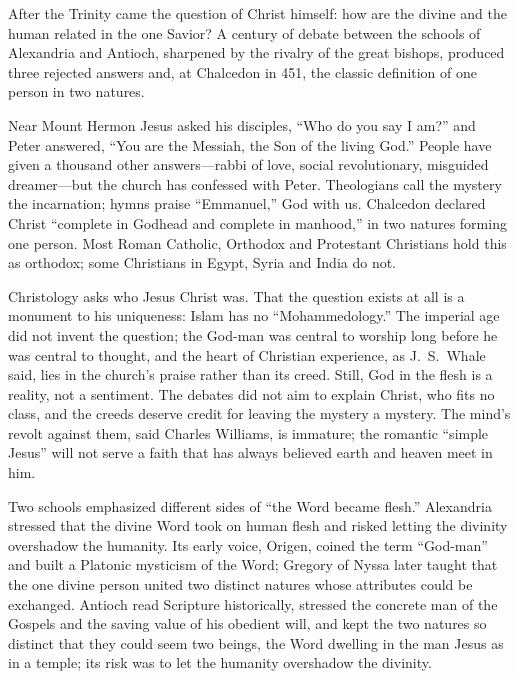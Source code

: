 
\begin{inbrief}
After the Trinity came the question of Christ himself: how are the divine and the human related in the
one Savior? A century of debate between the schools of Alexandria and Antioch, sharpened by the rivalry
of the great bishops, produced three rejected answers and, at Chalcedon in 451, the classic definition
of one person in two natures.
\end{inbrief}

Near Mount Hermon Jesus asked his disciples, ``Who do you say I am?'' and Peter answered, ``You are the
Messiah, the Son of the living God.'' People have given a thousand other answers---rabbi of love,
social revolutionary, misguided dreamer---but the church has confessed with Peter. Theologians call
the mystery the incarnation; hymns praise ``Emmanuel,'' God with us. Chalcedon declared Christ
``complete in Godhead and complete in manhood,'' in two natures forming one person. Most Roman
Catholic, Orthodox and Protestant Christians hold this as orthodox; some Christians in Egypt, Syria and
India do not.

Christology asks who Jesus Christ was. That the question exists at all is a monument to his
uniqueness: Islam has no ``Mohammedology.'' The imperial age did not invent the question; the God-man
was central to worship long before he was central to thought, and the heart of Christian experience,
as J.~S.~Whale said, lies in the church's praise rather than its creed. Still, God in the flesh is a
reality, not a sentiment. The debates did not aim to explain Christ, who fits no class, and the creeds deserve credit for leaving the mystery a mystery. The mind's revolt against them, said Charles
Williams, is immature; the romantic ``simple Jesus'' will not serve a faith that has always believed
earth and heaven meet in him.

Two schools emphasized different sides of ``the Word became flesh.'' Alexandria stressed that the
divine Word took on human flesh and risked letting the divinity overshadow the humanity. Its early
voice, Origen, coined the term ``God-man'' and built a Platonic mysticism of the Word; Gregory of Nyssa
later taught that the one divine person united two distinct natures whose attributes could be
exchanged. Antioch read Scripture historically, stressed the concrete man of the Gospels and the
saving value of his obedient will, and kept the two natures so distinct that they could seem two
beings, the Word dwelling in the man Jesus as in a temple; its risk was to let the humanity overshadow
the divinity.

